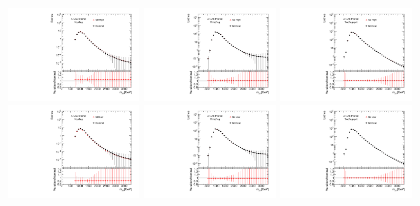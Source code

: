 \begin{figure}[htbp!]
\begin{center}
\includegraphics[angle=270, width=0.31\textwidth]{./figures/boosted/Syst_CRSB/SB_High_compare_FourTag_qcd_hh.pdf}
\includegraphics[angle=270, width=0.31\textwidth]{./figures/boosted/Syst_CRSB/SB_High_compare_ThreeTag_qcd_hh.pdf}
\includegraphics[angle=270, width=0.31\textwidth]{./figures/boosted/Syst_CRSB/SB_High_compare_TwoTag_split_qcd_hh.pdf}
\includegraphics[angle=270, width=0.31\textwidth]{./figures/boosted/Syst_CRSB/SB_Low_compare_FourTag_qcd_hh.pdf}
\includegraphics[angle=270, width=0.31\textwidth]{./figures/boosted/Syst_CRSB/SB_Low_compare_ThreeTag_qcd_hh.pdf}
\includegraphics[angle=270, width=0.31\textwidth]{./figures/boosted/Syst_CRSB/SB_Low_compare_TwoTag_split_qcd_hh.pdf}

\end{center}
\end{figure}
